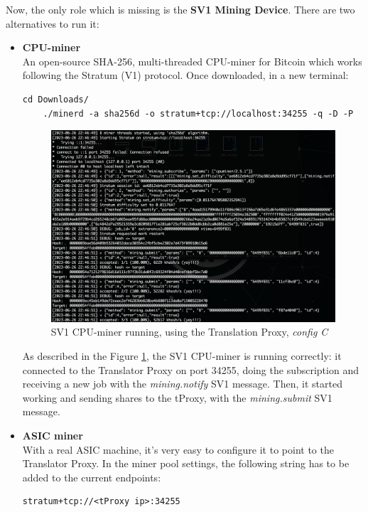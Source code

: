 \noindent Now, the only role which is missing is the \textbf{SV1 Mining Device}. There are two alternatives to run it:
\begin{itemize}
    \item \textbf{CPU-miner}\\
    An open-source SHA-256, multi-threaded CPU-miner for Bitcoin which works following the Stratum (V1) protocol. Once downloaded, in a new terminal:
    \begin{lstlisting}[style=bashStyle, numbers=none]
    cd Downloads/
    ./minerd -a sha256d -o stratum+tcp://localhost:34255 -q -D -P
    \end{lstlisting}
    \begin{figure}[h!]
    \centering
    \includegraphics[width=15cm]{Figures/sri/configC_3.png}
    \caption{SV1 CPU-miner running, using the Translation Proxy, \textit{config C}}
    \label{fig:cpuminer}
    \end{figure}
    As described in the Figure \ref{fig:cpuminer}, the SV1 CPU-miner is running correctly: it connected to the Translator Proxy on port 34255, doing the subscription and receiving a new job with the \textit{mining.notify} SV1 message.
    Then, it started working and sending shares to the tProxy, with the \textit{mining.submit} SV1 message.

    
    \item \textbf{ASIC miner}\\
    With a real ASIC machine, it's very easy to configure it to point to the Translator Proxy. In the miner pool settings, the following string has to be added to the current endpoints:
    \begin{lstlisting}[style=bashStyle, numbers=none]
    stratum+tcp://<tProxy ip>:34255
    \end{lstlisting}


\end{itemize}
